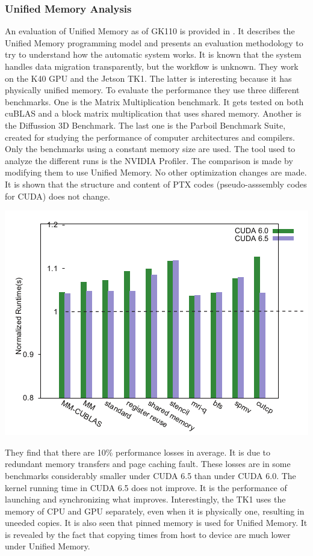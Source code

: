 \subsubsection{Unified Memory Analysis \cite{li2015evaluation}}
An evaluation of Unified Memory as of GK110 is provided in \cite{li2015evaluation}.
It describes the Unified Memory programming model and presents an evaluation methodology to try to understand how the automatic system works.
It is known that the system handles data migration transparently, but the workflow is unknown.
They work on the K40 GPU and the Jetson TK1.
The latter is interesting because it has physically unified memory.
To evaluate the performance they use three different benchmarks.
One is the Matrix Multiplication benchmark.
It gets tested on both cuBLAS and a block matrix multiplication that uses shared memory.
Another is the Diffussion 3D Benchmark.
The last one is the Parboil Benchmark Suite, created for studying the performance of computer architectures and compilers.
Only the benchmarks using a constant memory size are used.
The tool used to analyze the different runs is the NVIDIA Profiler.
The comparison is made by modifying them to use Unified Memory.
No other optimization changes are made.
It is shown that the structure and content of PTX codes (pseudo-asssembly codes for CUDA) does not change.

\includegraphics[width=0.9\linewidth]{unified_memory_benchmark_results}

They find that there are 10\% performance losses in average.
It is due to redundant memory transfers and page caching fault.
These losses are in some benchmarks considerably smaller under CUDA 6.5 than under CUDA 6.0.
The kernel running time in CUDA 6.5 does not improve.
It is the performance of launching and synchronizing what improves.
Interestingly, the TK1 uses the memory of CPU and GPU separately, even when it is physically one, resulting in uneeded copies.
It is also seen that pinned memory is used for Unified Memory.
It is revealed by the fact that copying times from host to device are much lower under Unified Memory.

